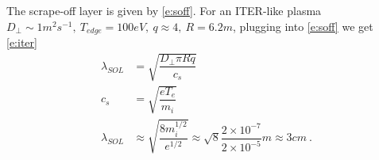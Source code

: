 \documentclass[10pt,a4paper]{article}
\begin{document}
	The scrape-off layer is given by \cref{e:soff}. For an ITER-like plasma $D_\perp \sim 1 m^2s^{-1},~ T_{edge} = 100 eV,~ q \approx 4,~ R = 6.2 m$, plugging into \cref{e:soff} we get \cref{e:iter}
	\begin{subequations}
		\begin{align}
		\lambda_{SOL} &= \sqrt{\dfrac{D_\perp \pi R q}{c_s}} \label{e:soff}\\
		c_s &= \sqrt{\dfrac{e T_e}{m_i}} \nonumber\\
		\lambda_{SOL} &\approx \sqrt{\dfrac{8 m_i^{1/2}}{e^{1/2}}} \approx \sqrt{8} \dfrac{2 \times 10^{-7}}{2 \times 10^{-5}}m \approx 3 cm\label{e:iter}~.
		\end{align}
	\end{subequations}
	
\end{document}
